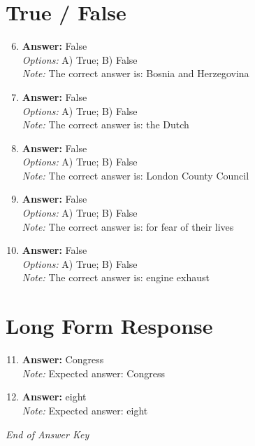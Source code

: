 \documentclass[12pt]{article}
\begin{document}
\section*{True / False}
\begin{enumerate}[label=\arabic*.]
\setcounter{enumi}{5}
\item \textbf{Answer:} False
\\ \textit{Options:} A) True; B) False
\\ \textit{Note:} The correct answer is: Bosnia and Herzegovina
\item \textbf{Answer:} False
\\ \textit{Options:} A) True; B) False
\\ \textit{Note:} The correct answer is: the Dutch
\item \textbf{Answer:} False
\\ \textit{Options:} A) True; B) False
\\ \textit{Note:} The correct answer is: London County Council
\item \textbf{Answer:} False
\\ \textit{Options:} A) True; B) False
\\ \textit{Note:} The correct answer is: for fear of their lives
\item \textbf{Answer:} False
\\ \textit{Options:} A) True; B) False
\\ \textit{Note:} The correct answer is: engine exhaust
\end{enumerate}

\section*{Long Form Response}
\begin{enumerate}[label=\arabic*.]
\setcounter{enumi}{10}
\item \textbf{Answer:} Congress
\\ \textit{Note:} Expected answer: Congress
\item \textbf{Answer:} eight
\\ \textit{Note:} Expected answer: eight
\end{enumerate}

\vfill
\noindent\textit{End of Answer Key}
\end{document}
